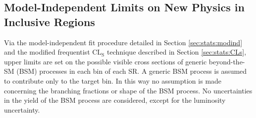 \subsection{Model-Independent Limits on New Physics in Inclusive Regions}

Via the model-independent fit procedure detailed in Section \ref{sec:stats:modind} and the modified frequentist \(\mathrm{CL_S}\) technique described in Section \ref{sec:stats:CLs}, upper limits are set on the possible visible cross sections of generic beyond-the-SM (BSM) processes in each \mZl bin of each SR.
A generic BSM process is assumed to contribute only to the target \mZl bin.
In this way no assumption is made concerning the \chono branching fractions or \mZl shape of the BSM process.
No uncertainties in the yield of the BSM process are considered, except for the luminosity uncertainty.

